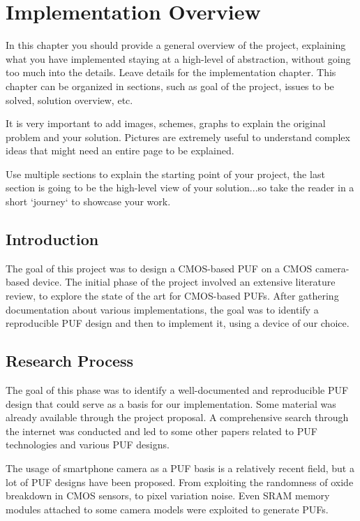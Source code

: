\chapter{Implementation Overview}
In this chapter you should provide a general overview of the project, explaining what you have implemented staying at a high-level of abstraction, without going too much into the details. Leave details for the implementation chapter. This chapter can be organized in sections, such as goal of the project, issues to be solved, solution overview, etc.

It is very important to add images, schemes, graphs to explain the original problem and your solution. Pictures are extremely useful to understand complex ideas that might need an entire page to be explained.

Use multiple sections to explain the starting point of your project, the last section is going to be the high-level view of your solution...so take the reader in a short `journey` to showcase your work.

\section{Introduction}
The goal of this project was to design a CMOS-based PUF on a CMOS camera-based device.
The initial phase of the project involved an extensive literature review, to explore the state of the art for CMOS-based PUFs.
After gathering documentation about various implementations, the goal was to identify a reproducible PUF design and then to implement it, using a device of our choice.

\section{Research Process}
The goal of this phase was to identify a well-documented and reproducible PUF design that could serve as a basis for our implementation.
Some material was already available through the project proposal. A comprehensive search through the internet was conducted and led to some other papers
related to PUF technologies and various PUF designs.

The usage of smartphone camera as a PUF basis is a relatively recent field, but a lot of PUF designs have been proposed. From exploiting the randomness of oxide breakdown in CMOS
sensors, to pixel variation noise. Even SRAM memory modules attached to some camera models were exploited to generate PUFs.

